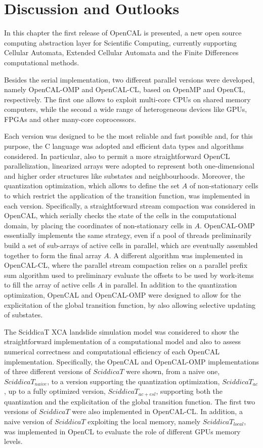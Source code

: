 \section{Discussion and Outlooks}

In this chapter the first release of OpenCAL is presented, a new
open source computing abstraction layer for Scientific Computing,
currently supporting Cellular Automata, Extended Cellular Automata
and the Finite Differences computational methods.

Besides the serial implementation, two different parallel versions
were developed, namely OpenCAL-OMP and OpenCAL-CL, based on OpenMP
and OpenCL, respectively. The first one allows to exploit multi-core
CPUs on shared memory computers, while the second a wide range of
heterogeneous devices like GPUs, FPGAs and other many-core
coprocessors.

Each version was designed to be the most reliable and fast possible
and, for this purpose, the C language was adopted and efficient data
types and algorithms considered. In particular, also to permit a
more straightforward OpenCL parallelization, linearized arrays were
adopted to represent both one-dimensional and higher order
structures like substates and neighbourhoods. Moreover, the
quantization optimization, which allows to define the set $A$ of
non-stationary cells to which restrict the application of the
transition function, was implemented in each version. Specifically,
a straightforward stream compaction was considered in OpenCAL, which
serially checks the state of the cells in the computational domain,
by placing the coordinates of non-stationary cells in
$A$. OpenCAL-OMP essentially implements the same strategy, even if a
pool of threads preliminarily build a set of sub-arrays of active
cells in parallel, which are eventually assembled together to form
the final array $A$. A different algorithm was implemented in
OpenCAL-CL, where the parallel stream compaction relies on a
parallel prefix sum algorithm used to preliminary evaluate the
offsets to be used by work-items to fill the array of active cells
$A$ in parallel. In addition to the quantization optimization,
OpenCAL and OpenCAL-OMP were designed to allow for the explicitation
of the global transition function, by also allowing selective
updating of substates.

The SciddicaT XCA landslide simulation model was considered to show
the straightforward implementation of a computational model and also
to assess numerical correctness and computational efficiency of each
OpenCAL implementation. Specifically, the OpenCAL and OpenCAL-OMP
implementations of three different versions of $SciddicaT$ were
shown, from a naive one, $SciddicaT_{naive}$, to a version
supporting the quantization optimization, $SciddicaT_{ac}$, up to a
fully optimized version, $SciddicaT_{ac+esl}$, supporting both the
quantization and the explicitation of the global transition
function. The first two versions of $SciddicaT$ were also
implemented in OpenCAL-CL. In addition, a naive version of
$SciddicaT$ exploiting the local memory, namely $SciddicaT_{local}$,
was implemented in OpenCL to evaluate the role of different GPUs
memory levels.

